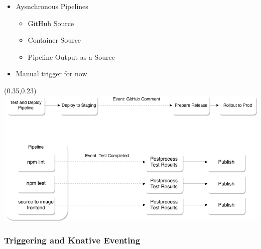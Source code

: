 \documentclass[aspectratio=169,11pt,hyperref={colorlinks=true}]{beamer}
\begin{document}
\begin{lblackrwhiteframe}
\begin{lblackrwhiteframe}
\begin{blackframe}
\begin{2columnsframe}
  {
  \begin{itemize}
    \item Aysnchronous Pipelines
    \begin{itemize}
      \item GitHub Source
      \item Container Source
      \item Pipeline Output as a Source
    \end{itemize}
    \item Manual trigger for now
  \end{itemize}
  }
  {
  \begin{textblock*}{0.6\paperwidth}(0.35\paperwidth,0.23\paperheight)
    \centering
    \includegraphics[width=0.6\paperwidth]{img/async_pipelines.png}
  \end{textblock*}
  }
  \frametitle{Triggering and Knative Eventing}
\end{2columnsframe}


\end{blackframe}
\end{lblackrwhiteframe}
\end{lblackrwhiteframe}
\end{document}
